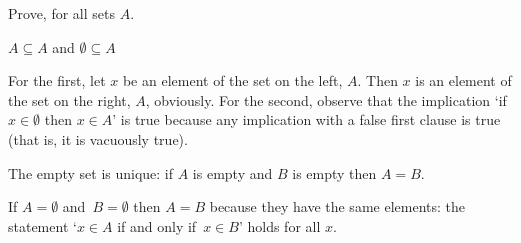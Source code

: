 \documentclass{test}  %
\begin{document}
\begin{problem} \label{ex:EmptySetUnique}
Prove, for all sets $A$. 
\begin{exes}
\begin{exercise} 
  $A\subseteq A$ and $\emptyset\subseteq A$
\end{exercise}
\begin{answer}
  For the first, let $x$ be an element of the set on the left, $A$.
  Then $x$ is an element of the set on the right, $A$, obviously.
  For the second, observe that the implication 
  `if $x\in\emptyset$ then $x\in A$' is true 
  because any implication with a false first clause is true
  (that is, it is vacuously true).  
\end{answer}
\begin{exercise} 
  The empty set is unique: if $A$ is empty and $B$ is empty then $A=B$.
\end{exercise}
\begin{answer}
  If $A=\emptyset$ and~$B=\emptyset$ then $A=B$ because they have the
  same elements: the statement `$x\in A$ if and only if~$x\in B$' holds   
  for all $x$.  
\end{answer}
\end{exes}

\end{problem}
\end{document}
